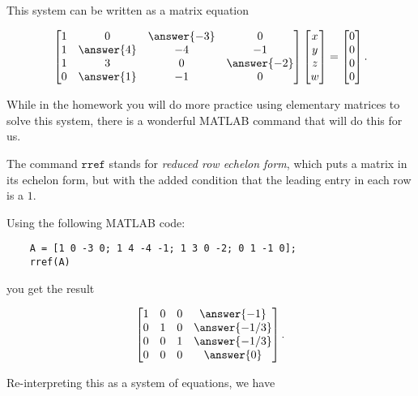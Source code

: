 \documentclass{ximera}
\begin{document}
\begin{exploration}
\begin{example}
\begin{solution}
  This system can be written as a matrix equation

  \begin{equation*}
    \begin{bmatrix}
      1 & 0 & \answer{-3} & 0 \\
      1 & \answer{4} & -4 & -1 \\
      1 & 3 & 0 & \answer{-2} \\
      0 & \answer{1} & -1 & 0
    \end{bmatrix}
    \begin{bmatrix}
      x \\
      y \\
      z \\
      w
    \end{bmatrix}
    =
    \begin{bmatrix}
      0 \\
      0 \\
      0 \\
      0
    \end{bmatrix}.
  \end{equation*}

  While in the homework you will do more practice using elementary matrices to solve this system, there is a wonderful MATLAB command that will do this for us. 

  The command $\texttt{rref}$ stands for \emph{reduced row echelon form}, which puts a matrix in its echelon form, but with the added condition that the leading entry in each row is a $1$.

  Using the following MATLAB code:

  \begin{verbatim}
    A = [1 0 -3 0; 1 4 -4 -1; 1 3 0 -2; 0 1 -1 0];
    rref(A)
  \end{verbatim}

  you get the result

  \begin{equation*}
    \begin{bmatrix}
      1 & 0 & 0 & \answer{-1} \\
      0 & 1 & 0 & \answer{-1/3} \\
      0 & 0 & 1 & \answer{-1/3} \\
      0 & 0 & 0 & \answer{0}
    \end{bmatrix}.
  \end{equation*}

  Re-interpreting this as a system of equations, we have


\end{solution}
\end{example}
\end{exploration}
\end{document}
